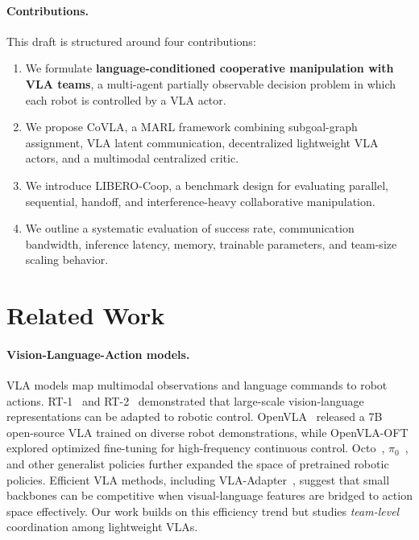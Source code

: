 \documentclass[11pt]{article}
\newcommand{\method}{CoVLA}
\newcommand{\liberocoop}{LIBERO-Coop}
\begin{document}
\paragraph{Contributions.}
This draft is structured around four contributions:
\begin{enumerate}
    \item We formulate \textbf{language-conditioned cooperative manipulation with VLA teams}, a multi-agent partially observable decision problem in which each robot is controlled by a VLA actor.
    \item We propose \method{}, a MARL framework combining subgoal-graph assignment, VLA latent communication, decentralized lightweight VLA actors, and a multimodal centralized critic.
    \item We introduce \liberocoop{}, a benchmark design for evaluating parallel, sequential, handoff, and interference-heavy collaborative manipulation.
    \item We outline a systematic evaluation of success rate, communication bandwidth, inference latency, memory, trainable parameters, and team-size scaling behavior.
\end{enumerate}

\section{Related Work}

\paragraph{Vision-Language-Action models.}
VLA models map multimodal observations and language commands to robot actions. RT-1~\citep{brohan2022rt1} and RT-2~\citep{brohan2023rt2} demonstrated that large-scale vision-language representations can be adapted to robotic control. OpenVLA~\citep{kim2024openvla} released a 7B open-source VLA trained on diverse robot demonstrations, while OpenVLA-OFT explored optimized fine-tuning for high-frequency continuous control. Octo~\citep{octo2024}, $\pi_0$~\citep{black2024pi0}, and other generalist policies further expanded the space of pretrained robotic policies. Efficient VLA methods, including VLA-Adapter~\citep{wang2025vlaadapter}, suggest that small backbones can be competitive when visual-language features are bridged to action space effectively. Our work builds on this efficiency trend but studies \emph{team-level} coordination among lightweight VLAs.
\end{document}
